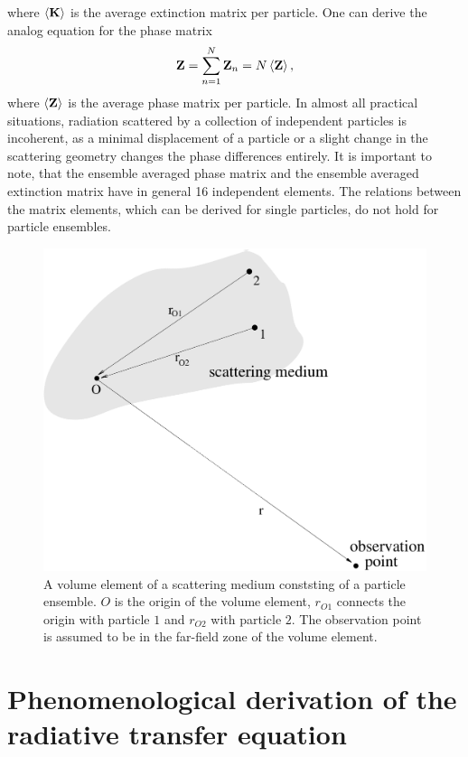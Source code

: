 where $\left\langle {\bf K} \right\rangle$ is the average extinction matrix per
particle. One can derive the analog equation for the phase matrix
 \begin{equation}
  \label{eq:rtetheory:pha_mat_tot}
  {\bf Z} = \sum_{n=1}^N  \mathbf{Z}_n = N \left\langle {\bf Z} \right\rangle,
\end{equation}
where $\left\langle {\bf Z} \right\rangle$ is the average phase matrix per particle.  In
almost all practical situations, radiation scattered by a collection
of independent particles is incoherent, as a minimal displacement of a
particle or a slight change in the scattering geometry changes the
phase differences entirely.  It is important to note, that the
ensemble averaged phase matrix and the ensemble averaged extinction
matrix have in general 16 independent elements. The relations between
the matrix elements, which can be derived for single particles, do not
hold for particle ensembles.

\begin{figure}[t]
 \begin{center}
   \includegraphics*[width=0.6\hsize]{part_ensemble}
   \caption{A volume element of a scattering medium conststing of a particle ensemble. $O$ is the origin of the volume element, $r_{O1}$ connects the origin with particle $1$ and $r_{O2}$ with particle $2$. The observation point is assumed to be in the far-field zone of the volume element.}
  \label{fig:part_ensembles}  
 \end{center}
\end{figure}


\section[Radiative transfer equation]{Phenomenological derivation of the radiative transfer equation}
\label{sec:rtetheory:theory_rte}

